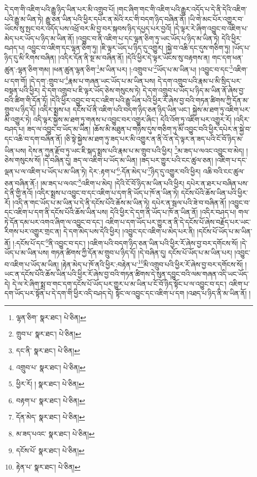 དེ་དག་གི་འཇིག་པའི་རྒྱུ་ཉིད་ཡིན་པར་མི་འགྲུབ་པོ། །གང་ཞིག་གང་གི་འཇིག་པའི་རྒྱུར་འདོད་པ་དེ་ནི་དེའི་འཇིག་པའི་རྒྱུ་མ་ཡིན་ཏེ། རྒྱུ་ཅན་ཡིན་པའི་ཕྱིར་དཔེར་ན་མེའི་རང་གི་བདག་ཉིད་བཞིན་ནོ། །ཡི་གེ་མང་པོར་འགྱུར་བ་ཡོངས་སུ་སྤང་བར་འདོད་པས་འཕྲོ་བར་མི་བྱ་བར་སྐབས་ཉིད་དཔྱད་པར་བྱའོ། །དེ་ལྟར་རེ་ཞིག་འབྱུང་བ་འཇིག་པ་མེད་པར་ཡོད་པ་ཉིད་མ་ཡིན་ནོ། །འབྱུང་བ་ནི་འཇིག་པ་དང་ལྷན་ཅིག་ཏུ་ཡང་ཡོད་པ་ཉིད་མ་ཡིན་ཏེ། དེའི་ཕྱིར་བཤད་པ། འབྱུང་བ་འཇིག་དང་ལྷན་ཅིག་ཏུ། །ཇི་ལྟར་ཡོད་པ་ཉིད་དུ་འགྱུར། །སྐྱེ་བ་འཆི་དང་དུས་གཅིག་ཏུ། །ཡོད་པ་ཉིད་དུ་མི་རིགས་བཞིན། །འདིར་དོན་ནི་སྔ་མ་བཞིན་ནོ། །དེའི་ཕྱིར་དེ་ལྟར་ཡོངས་སུ་བརྟགས་ན། གང་དག་ཕན་ཚུན་:ལྷན་ཅིག་གམ། །ཕན་ཚུན་ལྷན་ཅིག་\footnote{ལྷན་ཅིག་  སྣར་ཐང་།  པེ་ཅིན། }མ་ཡིན་པར། །:འགྲུབ་པ་\footnote{གྲུབ་པ་  སྣར་ཐང་།  པེ་ཅིན། }ཡོད་པ་མ་ཡིན་པ། །འབྱུང་བ་དང་\footnote{དང་ནི་  སྣར་ཐང་།  པེ་ཅིན། }འཇིག་པ་དག་གོ། །དེ་དག་:གྲུབ་པ་\footnote{འགྲུབ་པ་  སྣར་ཐང་།  པེ་ཅིན། }རྣམ་པ་གཞན་ཡང་ཡོད་པ་མ་ཡིན་པས། དེ་དག་འགྲུབ་པའི་རྣམ་པ་མི་སྲིད་པར་བསྟན་པའི་ཕྱིར། དེ་དག་འགྲུབ་པ་ཇི་ལྟར་ཡོད་ཅེས་གསུངས་ཏེ། དེ་དག་འགྲུབ་པ་ཡོད་པ་ཉིད་མ་ཡིན་ནོ་ཞེས་བྱ་བའི་ཚིག་གི་དོན་ཏོ། །དེའི་ཕྱིར་འབྱུང་བ་དང་འཇིག་པའི་རྒྱུ་ཡིན་པའི་ཕྱིར་རོ་ཞེས་བྱ་བའི་གཏན་ཚིགས་ཀྱི་དོན་མ་གྲུབ་པ་ཉིད་དོ། །འདིར་སྨྲས་པ། དངོས་པོ་ནི་འཇིག་པའི་བདག་ཉིད་ཅན་ཉིད་ཡིན་ཡང་། སྐྱེས་མ་ཐག་ཏུ་འཇིག་པར་མི་འགྱུར་ཏེ། འདི་ལྟར་སྐྱེས་མ་ཐག་ཏུ་གནས་པ་འབྱུང་བར་འགྱུར་ཞིང་། དེའི་འོག་ཏུ་འཇིག་པར་འགྱུར་རོ། །འདིར་བཤད་པ། ཟད་ལ་འབྱུང་བ་ཡོད་མ་ཡིན། །ཆོས་མི་མཐུན་པ་གཉིས་དུས་གཅིག་ཏུ་མི་འབྱུང་བའི་ཕྱིར་དཔེར་ན་སྐྱེ་བ་དང་འཆི་བ་དག་བཞིན་ནོ། །ཅི་སྟེ་སྐྱེས་མ་ཐག་ཏུ་ཟད་པར་མི་འགྱུར་ན་ནི་འོ་ན་དེ་ལྟར་ན་ཟད་པའི་ངོ་བོ་ཉིད་མ་ཡིན་པས། དེས་ན་ཀུན་རྫོབ་ཏུ་ཡང་ཇི་སྐད་སྨྲས་པའི་རྣམ་པ་མ་གྲུབ་པའི་ཕྱིར། \footnote{ཕྱིར་རོ། །   སྣར་ཐང་།  པེ་ཅིན། }མ་ཟད་པ་ལའང་འབྱུང་བ་མེད། །ཅེས་གསུངས་སོ། །དེ་བཞིན་དུ། ཟད་ལ་འཇིག་པ་ཡོད་མ་ཡིན། །ཟད་པར་གྱུར་པའི་ངང་ཚུལ་ཅན། །འཇིག་པ་དང་ལྡན་པ་ལ་འཇིག་པ་ཡོད་པ་མ་ཡིན་ཏེ། དེར་:རྟག་པ་\footnote{བརྟག་པ་  སྣར་ཐང་།  པེ་ཅིན། }:དོན་མེད་པ་\footnote{དོན་མེད་  སྣར་ཐང་།  པེ་ཅིན། }ཉིད་དུ་འགྱུར་བའི་ཕྱིར། འཆི་བའི་ངང་ཚུལ་ཅན་བཞིན་ནོ:། །མ་ཟད་པ་ལའང་\footnote{མ་ཟད་པའང་  སྣར་ཐང་།  པེ་ཅིན། }འཇིག་པ་མེད། །དེའི་ངོ་བོ་ཉིད་མ་ཡིན་པའི་ཕྱིར། དཔེར་ན་ཐར་པ་བཞིན་པས་དེ་ནི་གྱི་ནའོ། །འདིར་སྨྲས་པ་འབྱུང་བ་དང་འཇིག་པ་དག་ནི་ཡོད་པ་ཁོ་ན་ཡིན་ཏེ། དངོས་པོའི་ཆོས་ཡིན་པའི་ཕྱིར་རོ། །འདི་ན་གང་ཡོད་པ་མ་ཡིན་པ་དེ་ནི་དངོས་པོའི་ཆོས་མ་ཡིན་ཏེ། དཔེར་ན་སྦལ་པའི་ཟེ་བ་བཞིན་ནོ། །འབྱུང་བ་དང་འཇིག་པ་དག་ནི་དངོས་པོའི་ཆོས་ཡིན་པས། དེའི་ཕྱིར་དེ་དག་ནི་ཡོད་པ་ཁོ་ན་ཡིན་ནོ། །འདིར་བཤད་པ། གལ་ཏེ་དོན་དམ་པར་འགའ་ཞིག་ལ་འབྱུང་བ་དང་། འཇིག་པ་དག་ཡོད་པར་གྱུར་ན་ནི་དེ་དངོས་པོ་ཞེས་བརྗོད་པར་ཡང་རིགས་པར་འགྱུར་གྲང་ན། དེ་དག་མེད་པས་དེའི་ཕྱིར། །འབྱུང་དང་འཇིག་པ་མེད་པར་ནི། །དངོས་པོ་ཡོད་པ་མ་ཡིན་ནོ། །:དངོས་པོ་དང་\footnote{དངོས་པོ་  སྣར་ཐང་།  པེ་ཅིན། }ནི་འབྱུང་བ་དང་། །འཇིག་པའི་བདག་ཉིད་ཅན་ཡིན་པའི་ཕྱིར་རོ་ཞེས་བྱ་བར་དགོངས་སོ། །དེ་ཡོད་པ་མ་ཡིན་པས། གཏན་ཚིགས་ཀྱི་དོན་མ་གྲུབ་པ་ཉིད་དོ། །དེ་བཞིན་དུ། དངོས་པོ་ཡོད་པ་མ་ཡིན་པར། །འབྱུང་བ་འཇིག་པ་ཡོད་མ་ཡིན། །རྟེན་མེད་པ་ཁོ་ནའི་ཕྱིར་:བརྟེན་པ་\footnote{རྟེན་པ་  སྣར་ཐང་།  པེ་ཅིན། }མི་འགྲུབ་པའི་ཕྱིར་རོ་ཞེས་བྱ་བར་དགོངས་སོ། །ཡང་ན་དངོས་པོའི་ཆོས་ཡིན་པའི་ཕྱིར་རོ་ཞེས་བྱ་བའི་གཏན་ཚིགས་དེ་སུན་དབྱུང་བའི་ལམ་གཞན་འདི་ཡང་ཡོད་དེ། དེ་ལ་རེ་ཞིག་སྨྲ་བ་གང་དག་དངོས་པོ་ཡོད་པར་གྱུར་པ་མ་ཡིན་པ་ངོ་བོ་ཉིད་སྟོང་པ་ལ་འབྱུང་བ་དང་། འཇིག་པ་དག་ཡོད་པར་སྟོན་པ་དེ་དག་གི་ཕྱིར་འདི་བཤད་དེ། སྟོང་ལ་འབྱུང་དང་འཇིག་པ་དག །འཐད་པ་ཉིད་ནི་མ་ཡིན་ནོ། །
